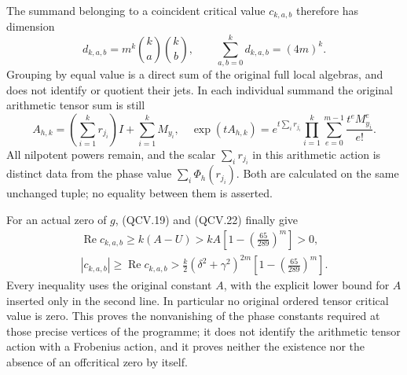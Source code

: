 The summand belonging to a coincident critical value \(c_{k,a,b}\)
therefore has dimension
\[
 d_{k,a,b}=m^k\binom ka\binom kb,
 \qquad \sum_{a,b=0}^kd_{k,a,b}=(4m)^k.
 \tag{QCV.25}
\]
Grouping by equal value is a direct sum of the original full local
algebras, and does not identify or quotient their jets. In each
individual summand the original arithmetic tensor sum is still
\[
 A_{h,k}=\left(\sum_{i=1}^kr_{j_i}\right)I+\sum_{i=1}^kM_{y_i},
 \quad
 \exp(tA_{h,k})=e^{t\sum_i r_{j_i}}
       \prod_{i=1}^k\sum_{e=0}^{m-1}\frac{t^eM_{y_i}^e}{e!}.
 \tag{QCV.26}
\]
All nilpotent powers remain, and the scalar \(\sum_i r_{j_i}\)
in this arithmetic action is distinct data from the phase value
\(\sum_i\Phi_h(r_{j_i})\). Both are calculated on the same
unchanged tuple; no equality between them is asserted.

For an actual zero of \(g\), (QCV.19) and (QCV.22) finally give
\[
 \boxed{\begin{gathered}
 \operatorname{Re}c_{k,a,b}
       \geq k(A-U)
       >kA\left[1-\left(\frac{65}{289}\right)^m\right]>0,\\
 |c_{k,a,b}|\geq\operatorname{Re}c_{k,a,b}
       >\frac{k}{2}(\delta^2+\gamma^2)^{2m}
                       \left[1-\left(\frac{65}{289}\right)^m\right].
 \end{gathered}}
 \tag{QCV.27}
\]
Every inequality uses the original constant \(A\), with the explicit
lower bound for \(A\) inserted only in the second line. In particular
no original ordered tensor critical value is zero. This proves the
nonvanishing of the phase constants required at those precise
vertices of the programme; it does not identify the arithmetic
tensor action with a Frobenius action, and it proves neither the
existence nor the absence of an offcritical zero by itself.
